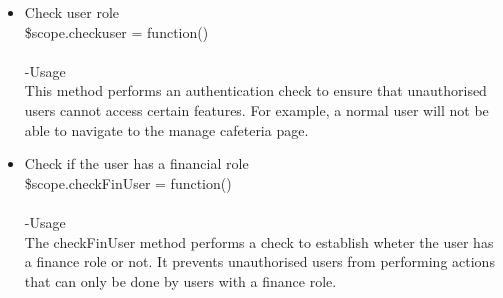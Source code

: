 \documentclass[a4paper,12pt]{report}
\begin{document}
\begin{enumerate}
\begin{itemize}
\item Check user role\\
 \$scope.checkuser = function()\\ \\
-Usage\\
This method performs an authentication check to ensure that unauthorised users cannot access certain features. For example, a normal user will not be able to navigate to the manage cafeteria page.

\item Check if the user has a financial role\\
 \$scope.checkFinUser = function()\\ \\
-Usage\\
The checkFinUser method performs a check to establish wheter the user has a finance role or not. It prevents unauthorised users from performing actions that can only be done by users with a finance role.
	\end{itemize}
 \end{enumerate}
\end{document}
